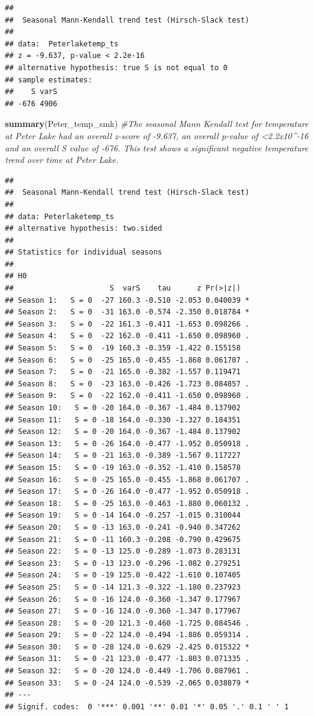 \documentclass[12pt,]{article}
\newenvironment{Shaded}{\begin{snugshade}}{\end{snugshade}}
\newcommand{\KeywordTok}[1]{\textcolor[rgb]{0.13,0.29,0.53}{\textbf{#1}}}
\newcommand{\CommentTok}[1]{\textcolor[rgb]{0.56,0.35,0.01}{\textit{#1}}}
\newcommand{\NormalTok}[1]{#1}
\begin{document}
\begin{verbatim}
## 
##  Seasonal Mann-Kendall trend test (Hirsch-Slack test)
## 
## data:  Peterlaketemp_ts
## z = -9.637, p-value < 2.2e-16
## alternative hypothesis: true S is not equal to 0
## sample estimates:
##    S varS 
## -676 4906
\end{verbatim}

\begin{Shaded}
\begin{Highlighting}[]
\KeywordTok{summary}\NormalTok{(Peter_temp_smk) }\CommentTok{#The seasonal Mann Kendall test for temperature at Peter Lake had an overall z-score of -9.637, an overall p-value of <2.2x10^-16 and an overall S value of -676. This test shows a significant negative temperature trend over time at Peter Lake.}
\end{Highlighting}
\end{Shaded}

\begin{verbatim}
## 
##  Seasonal Mann-Kendall trend test (Hirsch-Slack test)
## 
## data: Peterlaketemp_ts
## alternative hypothesis: two.sided
## 
## Statistics for individual seasons
## 
## H0
##                      S  varS    tau      z Pr(>|z|)  
## Season 1:   S = 0  -27 160.3 -0.510 -2.053 0.040039 *
## Season 2:   S = 0  -31 163.0 -0.574 -2.350 0.018784 *
## Season 3:   S = 0  -22 161.3 -0.411 -1.653 0.098266 .
## Season 4:   S = 0  -22 162.0 -0.411 -1.650 0.098960 .
## Season 5:   S = 0  -19 160.3 -0.359 -1.422 0.155158  
## Season 6:   S = 0  -25 165.0 -0.455 -1.868 0.061707 .
## Season 7:   S = 0  -21 165.0 -0.382 -1.557 0.119471  
## Season 8:   S = 0  -23 163.0 -0.426 -1.723 0.084857 .
## Season 9:   S = 0  -22 162.0 -0.411 -1.650 0.098960 .
## Season 10:   S = 0 -20 164.0 -0.367 -1.484 0.137902  
## Season 11:   S = 0 -18 164.0 -0.330 -1.327 0.184351  
## Season 12:   S = 0 -20 164.0 -0.367 -1.484 0.137902  
## Season 13:   S = 0 -26 164.0 -0.477 -1.952 0.050918 .
## Season 14:   S = 0 -21 163.0 -0.389 -1.567 0.117227  
## Season 15:   S = 0 -19 163.0 -0.352 -1.410 0.158578  
## Season 16:   S = 0 -25 165.0 -0.455 -1.868 0.061707 .
## Season 17:   S = 0 -26 164.0 -0.477 -1.952 0.050918 .
## Season 18:   S = 0 -25 163.0 -0.463 -1.880 0.060132 .
## Season 19:   S = 0 -14 164.0 -0.257 -1.015 0.310044  
## Season 20:   S = 0 -13 163.0 -0.241 -0.940 0.347262  
## Season 21:   S = 0 -11 160.3 -0.208 -0.790 0.429675  
## Season 22:   S = 0 -13 125.0 -0.289 -1.073 0.283131  
## Season 23:   S = 0 -13 123.0 -0.296 -1.082 0.279251  
## Season 24:   S = 0 -19 125.0 -0.422 -1.610 0.107405  
## Season 25:   S = 0 -14 121.3 -0.322 -1.180 0.237923  
## Season 26:   S = 0 -16 124.0 -0.360 -1.347 0.177967  
## Season 27:   S = 0 -16 124.0 -0.360 -1.347 0.177967  
## Season 28:   S = 0 -20 121.3 -0.460 -1.725 0.084546 .
## Season 29:   S = 0 -22 124.0 -0.494 -1.886 0.059314 .
## Season 30:   S = 0 -28 124.0 -0.629 -2.425 0.015322 *
## Season 31:   S = 0 -21 123.0 -0.477 -1.803 0.071335 .
## Season 32:   S = 0 -20 124.0 -0.449 -1.706 0.087961 .
## Season 33:   S = 0 -24 124.0 -0.539 -2.065 0.038879 *
## ---
## Signif. codes:  0 '***' 0.001 '**' 0.01 '*' 0.05 '.' 0.1 ' ' 1
\end{verbatim}
\end{document}
